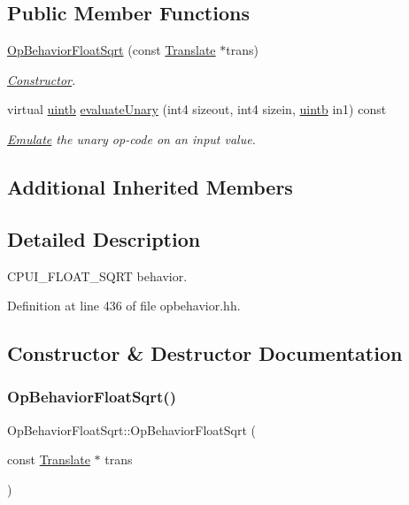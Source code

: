 \subsection*{Public Member Functions}
\begin{DoxyCompactItemize}
\item 
\mbox{\hyperlink{class_op_behavior_float_sqrt_a031dff289e5c20f8fc2d5cd94fdbdb0a}{Op\+Behavior\+Float\+Sqrt}} (const \mbox{\hyperlink{class_translate}{Translate}} $\ast$trans)
\begin{DoxyCompactList}\small\item\em \mbox{\hyperlink{class_constructor}{Constructor}}. \end{DoxyCompactList}\item 
virtual \mbox{\hyperlink{types_8h_a2db313c5d32a12b01d26ac9b3bca178f}{uintb}} \mbox{\hyperlink{class_op_behavior_float_sqrt_ad27be9da5d1712e397f6b4374f05e3a1}{evaluate\+Unary}} (int4 sizeout, int4 sizein, \mbox{\hyperlink{types_8h_a2db313c5d32a12b01d26ac9b3bca178f}{uintb}} in1) const
\begin{DoxyCompactList}\small\item\em \mbox{\hyperlink{class_emulate}{Emulate}} the unary op-\/code on an input value. \end{DoxyCompactList}\end{DoxyCompactItemize}
\subsection*{Additional Inherited Members}


\subsection{Detailed Description}
C\+P\+U\+I\+\_\+\+F\+L\+O\+A\+T\+\_\+\+S\+Q\+RT behavior. 

Definition at line 436 of file opbehavior.\+hh.



\subsection{Constructor \& Destructor Documentation}
\mbox{\label{class_op_behavior_float_sqrt_a031dff289e5c20f8fc2d5cd94fdbdb0a}} 
\subsubsection{\texorpdfstring{OpBehaviorFloatSqrt()}{OpBehaviorFloatSqrt()}}
{\footnotesize\ttfamily Op\+Behavior\+Float\+Sqrt\+::\+Op\+Behavior\+Float\+Sqrt (\begin{DoxyParamCaption}\item[{const \mbox{\hyperlink{class_translate}{Translate}} $\ast$}]{trans }\end{DoxyParamCaption})\hspace{0.3cm}{\ttfamily [inline]}}



